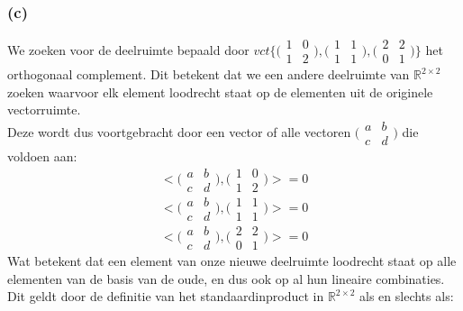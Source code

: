 \documentclass[lineaire_algebra_oplossingen.tex]{subfiles}
\begin{document}
\subsubsection*{(c)}
We zoeken voor de deelruimte bepaald door $vct\{\bigl(\begin{smallmatrix}
1 & 0 \\
1 & 2
\end{smallmatrix}\bigr),\bigl(\begin{smallmatrix}
1 & 1 \\
1 & 1
\end{smallmatrix}\bigr),\bigl(\begin{smallmatrix}
2 & 2 \\
0 & 1
\end{smallmatrix}\bigr)\}$  het orthogonaal complement. Dit betekent dat we een andere deelruimte van $\mathbb{R}^{2\times2}$ zoeken waarvoor elk element loodrecht staat op de elementen uit de originele vectorruimte.\\
Deze wordt dus voortgebracht door een vector of alle vectoren $\bigl(\begin{smallmatrix}
a & b \\
c & d
\end{smallmatrix}\bigr)$ die voldoen aan:
\[ <\bigl(\begin{smallmatrix}
a & b \\
c & d
\end{smallmatrix}\bigr),\bigl(\begin{smallmatrix}
1 & 0 \\
1 & 2
\end{smallmatrix}\bigr)> = 0\]
\[ <\bigl(\begin{smallmatrix}
a & b \\
c & d
\end{smallmatrix}\bigr),\bigl(\begin{smallmatrix}
1 & 1 \\
1 & 1
\end{smallmatrix}\bigr)> = 0\]
\[ <\bigl(\begin{smallmatrix}
a & b \\
c & d
\end{smallmatrix}\bigr),\bigl(\begin{smallmatrix}
2 & 2 \\
0 & 1
\end{smallmatrix}\bigr)> = 0\]
Wat betekent dat een element van onze nieuwe deelruimte loodrecht staat op alle elementen van de basis van de oude, en dus ook op al hun lineaire combinaties. Dit geldt door de definitie van het standaardinproduct in $\mathbb{R}^{2\times2}$ als en slechts als:
\end{document}

